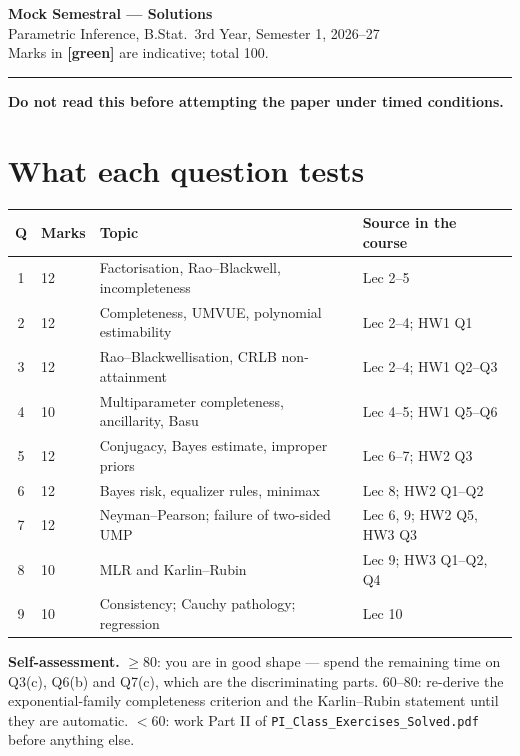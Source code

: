 \documentclass[11pt]{article}
\newcommand{\mk}[1]{{\small\color{ForestGreen}\textbf{[#1]}}}
\begin{document}
\begin{center}
{\LARGE\bfseries Mock Semestral --- Solutions}\\[4pt]
{\large Parametric Inference, B.Stat.\ 3rd Year, Semester 1, 2026--27}\\[6pt]
{\small Marks in \mk{green} are indicative; total 100.}
\end{center}

\vspace{4pt}\hrule\vspace{10pt}

\noindent\textbf{Do not read this before attempting the paper under timed conditions.}

\section*{What each question tests}
\renewcommand{\arraystretch}{1.25}
\begin{center}
\begin{tabular}{@{}clll@{}}
\toprule
\textbf{Q} & \textbf{Marks} & \textbf{Topic} & \textbf{Source in the course} \\
\midrule
1 & 12 & Factorisation, Rao--Blackwell, incompleteness & Lec 2--5 \\
2 & 12 & Completeness, UMVUE, polynomial estimability & Lec 2--4; HW1 Q1 \\
3 & 12 & Rao--Blackwellisation, CRLB non-attainment & Lec 2--4; HW1 Q2--Q3 \\
4 & 10 & Multiparameter completeness, ancillarity, Basu & Lec 4--5; HW1 Q5--Q6 \\
5 & 12 & Conjugacy, Bayes estimate, improper priors & Lec 6--7; HW2 Q3 \\
6 & 12 & Bayes risk, equalizer rules, minimax & Lec 8; HW2 Q1--Q2 \\
7 & 12 & Neyman--Pearson; failure of two-sided UMP & Lec 6, 9; HW2 Q5, HW3 Q3 \\
8 & 10 & MLR and Karlin--Rubin & Lec 9; HW3 Q1--Q2, Q4 \\
9 & 10 & Consistency; Cauchy pathology; regression & Lec 10 \\
\bottomrule
\end{tabular}
\end{center}

\noindent\textbf{Self-assessment.} $\ge80$: you are in good shape --- spend the remaining time
on Q3(c), Q6(b) and Q7(c), which are the discriminating parts. $60$--$80$: re-derive the
exponential-family completeness criterion and the Karlin--Rubin statement until they are
automatic. $<60$: work Part II of \texttt{PI\_Class\_Exercises\_Solved.pdf} before anything
else.
\end{document}
